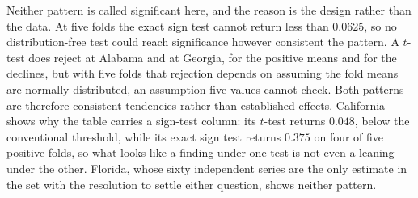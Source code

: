 Neither pattern is called significant here, and the reason is the design rather than the data. At
five folds the exact sign test cannot return less than $0.0625$, so no distribution-free test could
reach significance however consistent the pattern. A $t$-test does reject at Alabama and at Georgia,
for the positive means and for the declines, but with five folds that rejection depends on assuming
the fold means are normally distributed, an assumption five values cannot check. Both patterns are
therefore consistent tendencies rather than established effects. California shows why the table
carries a sign-test column: its $t$-test returns $0.048$, below the conventional threshold, while
its exact sign test returns $0.375$ on four of five positive folds, so what looks like a finding
under one test is not even a leaning under the other. Florida, whose sixty independent series are
the only estimate in the set with the resolution to settle either question, shows neither pattern.

